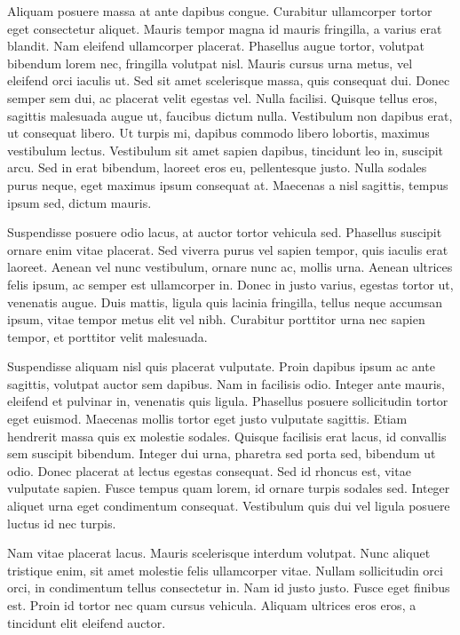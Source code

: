 Aliquam posuere massa at ante dapibus congue. Curabitur ullamcorper tortor eget consectetur aliquet. Mauris tempor magna id mauris fringilla, a varius erat blandit. Nam eleifend ullamcorper placerat. Phasellus augue tortor, volutpat bibendum lorem nec, fringilla volutpat nisl. Mauris cursus urna metus, vel eleifend orci iaculis ut. Sed sit amet scelerisque massa, quis consequat dui. Donec semper sem dui, ac placerat velit egestas vel. Nulla facilisi. Quisque tellus eros, sagittis malesuada augue ut, faucibus dictum nulla. Vestibulum non dapibus erat, ut consequat libero. Ut turpis mi, dapibus commodo libero lobortis, maximus vestibulum lectus. Vestibulum sit amet sapien dapibus, tincidunt leo in, suscipit arcu. Sed in erat bibendum, laoreet eros eu, pellentesque justo. Nulla sodales purus neque, eget maximus ipsum consequat at. Maecenas a nisl sagittis, tempus ipsum sed, dictum mauris.

Suspendisse posuere odio lacus, at auctor tortor vehicula sed. Phasellus suscipit ornare enim vitae placerat. Sed viverra purus vel sapien tempor, quis iaculis erat laoreet. Aenean vel nunc vestibulum, ornare nunc ac, mollis urna. Aenean ultrices felis ipsum, ac semper est ullamcorper in. Donec in justo varius, egestas tortor ut, venenatis augue. Duis mattis, ligula quis lacinia fringilla, tellus neque accumsan ipsum, vitae tempor metus elit vel nibh. Curabitur porttitor urna nec sapien tempor, et porttitor velit malesuada.

Suspendisse aliquam nisl quis placerat vulputate. Proin dapibus ipsum ac ante sagittis, volutpat auctor sem dapibus. Nam in facilisis odio. Integer ante mauris, eleifend et pulvinar in, venenatis quis ligula. Phasellus posuere sollicitudin tortor eget euismod. Maecenas mollis tortor eget justo vulputate sagittis. Etiam hendrerit massa quis ex molestie sodales. Quisque facilisis erat lacus, id convallis sem suscipit bibendum. Integer dui urna, pharetra sed porta sed, bibendum ut odio. Donec placerat at lectus egestas consequat. Sed id rhoncus est, vitae vulputate sapien. Fusce tempus quam lorem, id ornare turpis sodales sed. Integer aliquet urna eget condimentum consequat. Vestibulum quis dui vel ligula posuere luctus id nec turpis.

Nam vitae placerat lacus. Mauris scelerisque interdum volutpat. Nunc aliquet tristique enim, sit amet molestie felis ullamcorper vitae. Nullam sollicitudin orci orci, in condimentum tellus consectetur in. Nam id justo justo. Fusce eget finibus est. Proin id tortor nec quam cursus vehicula. Aliquam ultrices eros eros, a tincidunt elit eleifend auctor.

